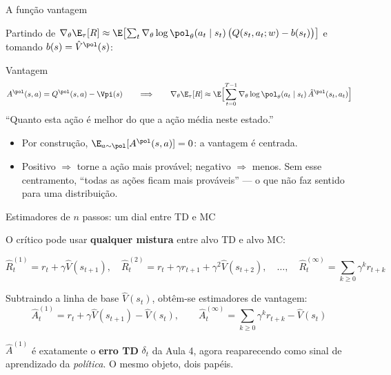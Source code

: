 \documentclass[aspectratio=169, 11pt]{beamer}
\newcommand{\thv}{\theta}                       %
\newcommand{\wv}{w}                             %
\newcommand{\polth}{\pol_{\thv}}                %
\newcommand{\gth}{\nabla_{\thv}}                %
\newcommand{\traj}{\tau}                        %
\newcommand{\Vhat}{\hat{V}}
\newcommand{\Ahat}{\hat{A}}
\newcommand{\Advpi}{A^{\pol}}
\begin{document}
\begin{frame}{A função vantagem}

  Partindo de
  $\gth \E_\traj[R] \approx \E\bigl[\sum_t \gth\log\polth(a_t\mid s_t)\,
   \bigl(Q(s_t,a_t;\wv) - b(s_t)\bigr)\bigr]$
  e tomando $b(s) = \Vhat^{\pol}(s)$:

  \begin{defbox}{Vantagem}
    \[
      \Advpi(s,a) = Q^{\pol}(s,a) - \Vpi(s)
      \qquad\Longrightarrow\qquad
      \gth \E_\traj[R] \approx \E\Bigl[\sum_{t=0}^{T-1}
        \gth \log \polth(a_t\mid s_t)\, \Ahat^{\pol}(s_t,a_t)\Bigr]
    \]
    ``Quanto esta ação é melhor do que a ação média neste estado.''
  \end{defbox}

  \begin{itemize}\setlength{\itemsep}{0.3ex}
    \item Por construção, $\E_{a\sim\pol}[\Advpi(s,a)] = 0$: a vantagem é
      centrada.
    \item Positivo $\Rightarrow$ torne a ação mais provável; negativo
      $\Rightarrow$ menos. Sem esse centramento, ``todas as ações ficam mais
      prováveis'' --- o que não faz sentido para uma distribuição.
  \end{itemize}
\end{frame}

\begin{frame}{Estimadores de $n$ passos: um dial entre TD e MC}

  O crítico pode usar \textbf{qualquer mistura} entre alvo TD e alvo MC:

  \[
    \hat{R}^{(1)}_t = r_t + \gamma \Vhat(s_{t+1}),
    \quad
    \hat{R}^{(2)}_t = r_t + \gamma r_{t+1} + \gamma^2 \Vhat(s_{t+2}),
    \quad \dots, \quad
    \hat{R}^{(\infty)}_t = \sum_{k\ge 0}\gamma^k r_{t+k}
  \]

  Subtraindo a linha de base $\Vhat(s_t)$, obtêm-se estimadores de vantagem:
  \[
    \Ahat^{(1)}_t = r_t + \gamma \Vhat(s_{t+1}) - \Vhat(s_t),
    \qquad
    \Ahat^{(\infty)}_t = \sum_{k\ge 0}\gamma^k r_{t+k} - \Vhat(s_t)
  \]

  \begin{ideiabox}
    $\Ahat^{(1)}$ é exatamente o \textbf{erro TD} $\delta_t$ da Aula 4, agora
    reaparecendo como sinal de aprendizado da \emph{política}. O mesmo objeto,
    dois papéis.
  \end{ideiabox}
\end{frame}
\end{document}
